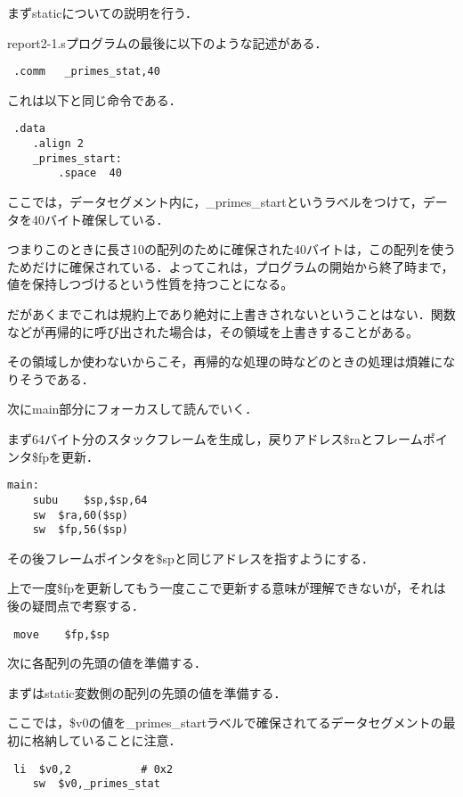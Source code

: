 \documentclass[a4j]{jarticle}
\begin{document}
まずstaticについての説明を行う．

report2-1.sプログラムの最後に以下のような記述がある．

\begin{verbatim}
 .comm   _primes_stat,40
\end{verbatim}

これは以下と同じ命令である．

\begin{verbatim}
 .data
    .align 2
    _primes_start:
        .space  40
\end{verbatim}

ここでは，データセグメント内に，\_primes\_startというラベルをつけて，データを40バイト確保している．

つまりこのときに長さ10の配列のために確保された40バイトは，この配列を使うためだけに確保されている．よってこれは，プログラムの開始から終了時まで，値を保持しつづけるという性質を持つことになる。

だがあくまでこれは規約上であり絶対に上書きされないということはない．関数などが再帰的に呼び出された場合は，その領域を上書きすることがある。

その領域しか使わないからこそ，再帰的な処理の時などのときの処理は煩雑になりそうである．


次にmain部分にフォーカスして読んでいく．

まず64バイト分のスタックフレームを生成し，戻りアドレス\$raとフレームポインタ\$fpを更新．

\begin{verbatim}
main:
    subu    $sp,$sp,64
    sw  $ra,60($sp)
    sw  $fp,56($sp)
\end{verbatim}

その後フレームポインタを\$spと同じアドレスを指すようにする．

上で一度\$fpを更新してもう一度ここで更新する意味が理解できないが，それは後の疑問点で考察する．

\begin{verbatim}
 move    $fp,$sp
\end{verbatim}

次に各配列の先頭の値を準備する．

まずはstatic変数側の配列の先頭の値を準備する．

ここでは，\$v0の値を\_primes\_startラベルで確保されてるデータセグメントの最初に格納していることに注意．


\begin{verbatim}
 li  $v0,2           # 0x2
    sw  $v0,_primes_stat
\end{verbatim}
\end{document}
